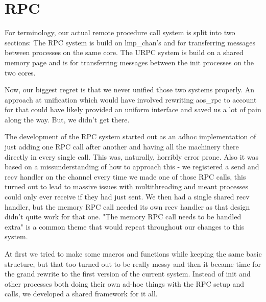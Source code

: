 \section{RPC}\label{s:RPC}
For terminology, our actual remote procedure call system is split into two sections:
The RPC system is build on lmp\_chan's and for transferring messages between processes on the same core.
The URPC system is build on a shared memory page and is for transferring messages between the init processes on the two cores.

Now, our biggest regret is that we never unified those two systems properly. An approach at unification which would have involved rewriting aos\_rpc to account for that could have likely provided an uniform interface and saved us a lot of pain along the way. But, we didn't get there.

The development of the RPC system started out as an adhoc implementation of just adding one RPC call after another and having all the machinery there directly in every single call. This was, naturally, horribly error prone. Also it was based on a missunderstanding of how to approach this - we registered a send and recv handler on the channel every time we made one of those RPC calls, this turned out to lead to massive issues with multithreading and meant processes could only ever receive if they had just sent. We then had a single shared recv handler, but the memory RPC call needed its own recv handler as that design didn't quite work for that one. "The memory RPC call needs to be handled extra" is a common theme that would repeat throughout our changes to this system.

At first we tried to make some macros and functions while keeping the same basic structure, but that too turned out to be really messy and then it became time for the grand rewrite to the first version of the current system. Instead of init and other processes both doing their own ad-hoc things with the RPC setup and calls, we developed a shared framework for it all.

